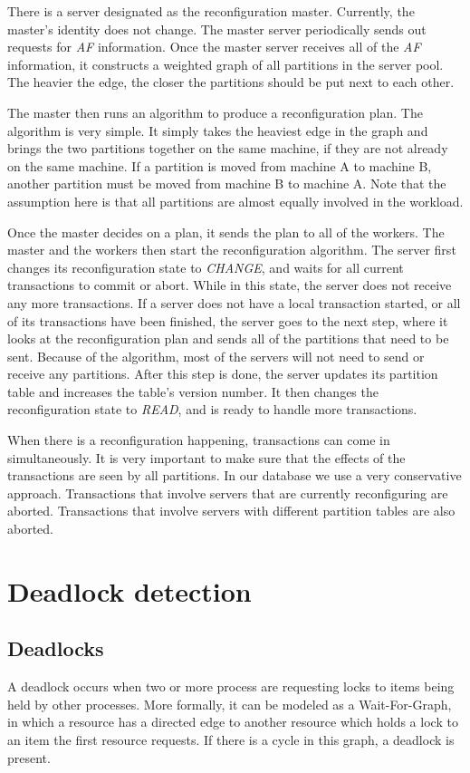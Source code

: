 \documentclass[a4paper, 10pt, notitlepage]{article}
\begin{document}
There is a server designated as the reconfiguration master. Currently, the master's identity does not change. The master server
periodically sends out requests for {\em AF} information. Once the master server receives all of the {\em AF} information, it
constructs a weighted graph of all partitions in the server pool. The heavier the edge, the closer the partitions should be 
put next to each other. 

The master then runs an algorithm to produce a reconfiguration plan. The algorithm is very simple. It simply takes the heaviest
edge in the graph and brings the two partitions together on the same machine, if they are not already on the same machine.
If a partition is moved from machine A to machine B, another partition must be moved from machine B to machine A. Note that the
assumption here is that all partitions are almost equally involved in the workload. 

Once the master decides on a plan, it sends the plan to all of the workers. The master and the workers then start the reconfiguration
algorithm. The server first changes its reconfiguration state to {\em CHANGE}, and waits for all current transactions to commit
or abort. While in this state, the server does not receive any more transactions.
If a server does not have a local transaction started, or all of its transactions have been finished, the server goes
to the next step, where it looks at the reconfiguration plan and sends all of the partitions that need to be sent. Because of the 
algorithm, most of the servers will not need to send or receive any partitions. After this step is done, the server updates its
partition table and increases the table's version number. It then changes the reconfiguration state to {\em READ}, and is ready
to handle more transactions.

When there is a reconfiguration happening, transactions can come in simultaneously. It is very important to make sure that the effects
of the transactions are seen by all partitions. In our database we use a very conservative approach. Transactions that involve servers
that are currently reconfiguring are aborted. Transactions that involve servers with different partition tables are also aborted.


\section{Deadlock detection}

\subsection{Deadlocks}
A deadlock occurs when two or more process are requesting locks to items being held by other processes. More formally, it can be modeled as a Wait-For-Graph, in which a resource has a directed edge to another resource which holds a lock to an item the first resource requests. If there is a cycle in this graph, a deadlock is present.
\end{document}
